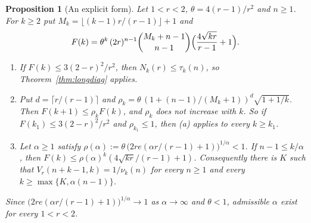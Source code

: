 \documentclass[11pt]{article}
\newtheorem{proposition}[theorem]{Proposition}
\begin{document}
\begin{proposition}[An explicit form]\label{prop:longdiagexplicit}
Let $1<r<2$, $\theta=4(r-1)/r^2$ and $n\ge1$.  For $k\ge2$ put
$M_k=\lfloor(k-1)r/(r-1)\rfloor+1$ and
\[
  F(k)=\theta^k\,(2r)^{n-1}\binom{M_k+n-1}{n-1}
  \Bigl(\frac{4\sqrt{kr}}{r-1}+1\Bigr).
\]
\begin{enumerate}
\item[(a)] If $F(k)\le3(2-r)^2/r^2$, then $N_k(r)\le\tau_k(n)$, so
Theorem~\ref{thm:longdiag} applies.
\item[(b)] Put $d=\lceil r/(r-1)\rceil$ and
$\rho_k=\theta\,(1+(n-1)/(M_k+1))^d\sqrt{1+1/k}$.  Then $F(k+1)\le\rho_kF(k)$,
and $\rho_k$ does not increase with $k$.  So if $F(k_1)\le3(2-r)^2/r^2$ and
$\rho_{k_1}\le1$, then (a) applies to every $k\ge k_1$.
\item[(c)] Let $\alpha\ge1$ satisfy
$\rho(\alpha):=\theta\,\bigl(2re(\alpha r/(r-1)+1)\bigr)^{1/\alpha}<1$.  If
$n-1\le k/\alpha$, then
$F(k)\le\rho(\alpha)^k(4\sqrt{kr}/(r-1)+1)$.  Consequently there is $K$ such
that $V_r(n+k-1,k)=1/\nu_k(n)$ for every $n\ge1$ and every
$k\ge\max\{K,\alpha(n-1)\}$.
\end{enumerate}
Since $\bigl(2re(\alpha r/(r-1)+1)\bigr)^{1/\alpha}\to1$ as $\alpha\to\infty$
and $\theta<1$, admissible $\alpha$ exist for every $1<r<2$.
\end{proposition}
\end{document}
